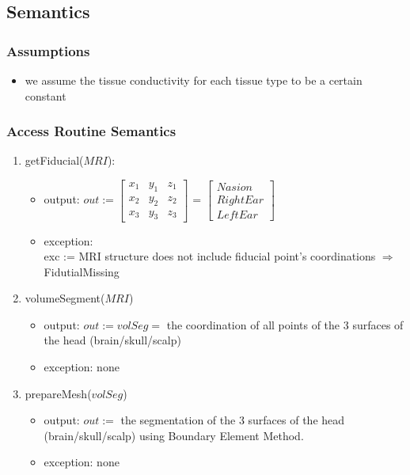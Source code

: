\documentclass[12pt, titlepage]{article}
\begin{document}
\subsection{Semantics}



\subsubsection{Assumptions}
\begin{itemize}
\item we assume the tissue conductivity for each tissue type to be a certain constant
\end{itemize}

\subsubsection{Access Routine Semantics}
\begin{enumerate}
\item getFiducial($MRI$):
\begin{itemize}
\item output: $out := \begin{bmatrix}
x_1 &y_1&z_1\\
x_2 &y_2&z_2\\
x_3 &y_3&z_3
\end{bmatrix}$
 = $ \begin{bmatrix}
Nasion\\
Right Ear\\
Left Ear
\end{bmatrix}$

\item exception: \\
exc := MRI structure does not include fiducial point's coordinations $\Rightarrow$  FidutialMissing
\end{itemize}


\item volumeSegment($MRI$)
\begin{itemize}
\item output: $out := volSeg = $ the coordination of all points of the 3 surfaces of the head (brain/skull/scalp)
\item exception: none
\end{itemize}

\item prepareMesh($volSeg$)
\begin{itemize}
\item output: $out := $ the segmentation of the 3 surfaces of the head (brain/skull/scalp) using Boundary Element Method.

\item exception: none
\end{itemize}
\end{enumerate}
\end{document}
